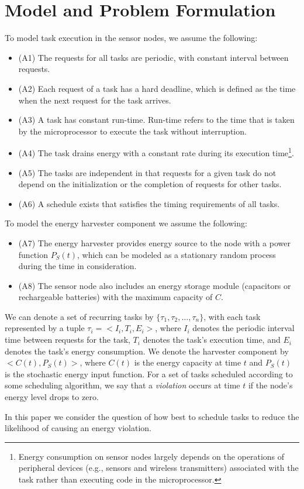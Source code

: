 \section{Model and Problem Formulation} \label{sec:model}

To model task execution in the sensor nodes, we assume the following: 
\begin{itemize}
	\item (A1) The requests for all tasks are periodic, with constant interval between requests. 
	\item (A2) Each request of a task has a hard deadline, which is defined as the time when the next request for the task arrives. 
	\item (A3) A task has constant run-time. Run-time refers to the time that  is taken by the microprocessor to execute the task without interruption.
	\item (A4) The task drains energy with a constant rate during its execution time\footnote{Energy consumption on sensor nodes largely depends on the operations of peripheral devices (e.g., sensors and wireless transmitters) associated with the task rather than executing code in the microprocessor.}.       
	\item (A5) The tasks are independent in that requests for a given task do not depend on the initialization or the completion of requests for other tasks.
	\item (A6) A schedule exists that satisfies the timing requirements of all tasks.
\end{itemize}

To model the energy harvester component we assume the following:
 \begin{itemize}
	\item (A7) The energy harvester provides energy source to the node with a power function $P_S(t)$, which can be modeled as a stationary random process during the time in consideration.
	\item (A8) The sensor node also includes an energy storage module (capacitors or rechargeable batteries) with the maximum capacity of $C$. 
\end{itemize}
 
We can denote a set of recurring tasks by $\{\tau_1, \tau_2, \ldots, \tau_n\}$, with each task represented by a tuple $\tau_i = <I_i, T_i, E_i>$, where $I_i$ denotes the periodic interval time between requests for the task, $T_i$ denotes the task's execution time, and $E_i$ denotes the task's energy consumption. We denote the harvester component by $<C(t), P_S(t)>$, where $C(t)$ is the energy capacity at time $t$ and $P_S(t)$ is the stochastic energy input function. For a set of tasks scheduled according to some scheduling algorithm, we say that a \textit{violation} occurs at time $t$ if the node's energy level drops to zero.

In this paper we consider the question of how best to schedule tasks to reduce the likelihood of causing an energy violation.